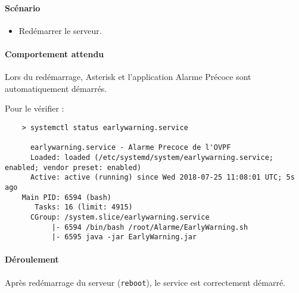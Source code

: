 \documentclass{article}
\begin{document}
\paragraph{Scénario\\}

\begin{itemize}
    \item Redémarrer le serveur.
\end{itemize}

\paragraph{Comportement attendu\\}

Lors du redémarrage, Asterisk et l'application Alarme Précoce sont automatiquement démarrés. 

Pour le vérifier :

\begin{verbatim}
    > systemctl status earlywarning.service

      earlywarning.service - Alarme Precoce de l'OVPF
      Loaded: loaded (/etc/systemd/system/earlywarning.service; enabled; vendor preset: enabled)
      Active: active (running) since Wed 2018-07-25 11:08:01 UTC; 5s ago
    Main PID: 6594 (bash)
       Tasks: 16 (limit: 4915)
      CGroup: /system.slice/earlywarning.service
           |- 6594 /bin/bash /root/Alarme/EarlyWarning.sh
           |- 6595 java -jar EarlyWarning.jar
\end{verbatim}

\paragraph{Déroulement\\} Après redémarrage du serveur (\texttt{reboot}), le service est correctement démarré. 
\end{document}
